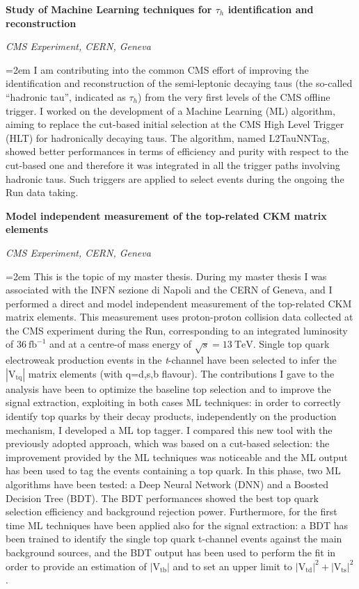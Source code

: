 \documentclass[paper=a4,fontsize=12pt]{article} %
\newcommand{\sepspace}{\vspace*{1em}}		%
\newcommand{\EducationEntry}[4]{
	\noindent \textbf{#1} \hfill      %
	{#2} \par  %
	\noindent \textit{#3} \par        %
	\noindent\hangindent=2em\hangafter=0 \small #4 %
	\normalsize \par}
\begin{document}
    \EducationEntry{Study of Machine Learning techniques for $\tau_{h}$ identification and reconstruction}{}{CMS Experiment, CERN, Geneva}{I am contributing into the common CMS effort of improving the identification and reconstruction of the semi-leptonic decaying taus (the so-called ``hadronic tau'', indicated as $\tau_h$)  from the very first levels of the CMS offline trigger. I worked on the development of a Machine Learning (ML) algorithm, aiming to replace the cut-based initial selection at the CMS High Level Trigger (HLT) for hadronically decaying taus. The algorithm, named L2TauNNTag, showed better performances in terms of efficiency and purity with respect to the cut-based one and therefore it was integrated in all the trigger paths involving hadronic taus. Such triggers are applied to select events during the ongoing the Run\;3 data taking.}
    \sepspace
    \EducationEntry{Model independent measurement of the top-related CKM matrix elements}{}{CMS Experiment, CERN, Geneva}{This is the topic of my master thesis. During my master thesis I was associated with the INFN sezione di Napoli and the CERN of Geneva, and I performed a direct and model independent measurement of the top-related CKM matrix elements. This measurement uses proton-proton collision data collected at the CMS experiment during the Run\;2, corresponding to an integrated luminosity of $\SI{36}{\femto\barn}^{-1}$ and at a centre-of mass energy of $\sqrt{s}=\SI{13}{\tera\electronvolt}$.   Single top quark electroweak production events in the \textit{t}-channel have been selected to infer the $|\text{V}_{\text{tq}}|$ matrix elements (with q=d,s,b flavour). The contributions I gave to the analysis have been to optimize the baseline top selection and to improve the signal extraction, exploiting in both cases ML techniques: in order to correctly identify top quarks by their decay products, independently on the production mechanism, I developed a ML top tagger. I compared this new tool with the previously adopted approach, which was based on a cut-based selection: the improvement provided by the ML techniques was noticeable and the ML output has been used to tag the events containing a top quark. In this phase, two ML algorithms have been tested: a Deep Neural Network (DNN) and a Boosted Decision Tree (BDT). The BDT performances showed the best top quark selection efficiency and background rejection power. Furthermore, for the first time ML techniques have been applied also for the signal extraction: a BDT has been trained to identify the single top quark t-channel events against the main background sources, and the BDT output has been used to perform the fit in order to provide an estimation of $|\text{V}_{\text{tb}}|$ and to set an upper limit to $|\text{V}_{\text{td}}|^{2}+|\text{V}_{\text{ts}}|^{2}$.}
\end{document}
